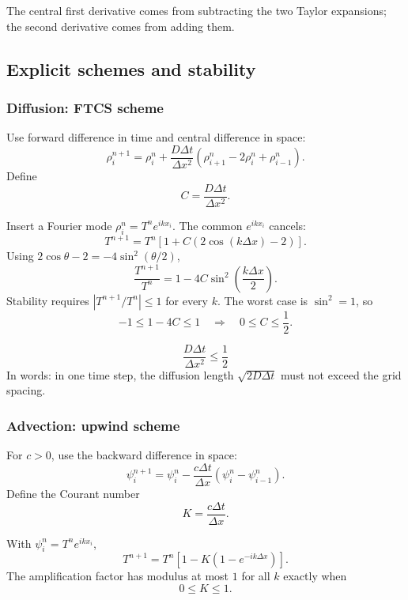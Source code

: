 \documentclass[10.5pt,a4paper]{article}
\begin{document}
The central first derivative comes from subtracting the two Taylor
expansions; the second derivative comes from adding them.

\subsection{Explicit schemes and stability}

\subsubsection*{Diffusion: FTCS scheme}

Use forward difference in time and central difference in space:
\[
\rho_i^{n+1}
=\rho_i^n+\frac{D\Delta t}{\Delta x^2}
\left(\rho_{i+1}^n-2\rho_i^n+\rho_{i-1}^n\right).
\]
Define
\[
C=\frac{D\Delta t}{\Delta x^2}.
\]

\begin{derivbox}
Insert a Fourier mode \(\rho_i^n=T^n e^{ikx_i}\). The common
\(e^{ikx_i}\) cancels:
\[
T^{n+1}=T^n\left[1+C\left(2\cos(k\Delta x)-2\right)\right].
\]
Using \(2\cos\theta-2=-4\sin^2(\theta/2)\),
\[
\frac{T^{n+1}}{T^n}
=1-4C\sin^2\!\left(\frac{k\Delta x}{2}\right).
\]
Stability requires \(|T^{n+1}/T^n|\le1\) for every \(k\). The worst case
is \(\sin^2=1\), so
\[
-1\le1-4C\le1
\quad\Longrightarrow\quad
0\le C\le\frac12.
\]
\end{derivbox}

\begin{keybox}
\[
\boxed{\;\frac{D\Delta t}{\Delta x^2}\le\frac12\;}
\]
In words: in one time step, the diffusion length \(\sqrt{2D\Delta t}\)
must not exceed the grid spacing.
\end{keybox}

\subsubsection*{Advection: upwind scheme}

For \(c>0\), use the backward difference in space:
\[
\psi_i^{n+1}
=\psi_i^n-\frac{c\Delta t}{\Delta x}
\left(\psi_i^n-\psi_{i-1}^n\right).
\]
Define the Courant number
\[
K=\frac{c\Delta t}{\Delta x}.
\]

\begin{derivbox}
With \(\psi_i^n=T^n e^{ikx_i}\),
\[
T^{n+1}=T^n\left[1-K\left(1-e^{-ik\Delta x}\right)\right].
\]
The amplification factor has modulus at most \(1\) for all \(k\)
exactly when
\[
0\le K\le1.
\]
\end{derivbox}
\end{document}
